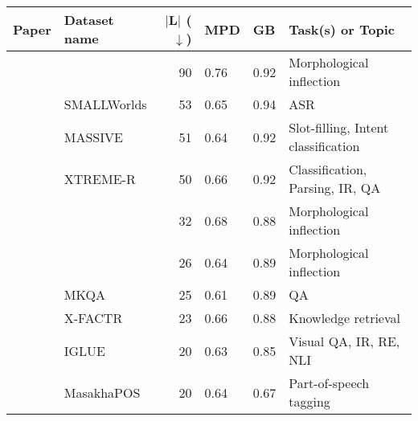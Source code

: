 \begin{tabular}{llrlll}
	\toprule
	\textbf{Paper}                                & \textbf{Dataset name}  & \textbf{$|$L$|$ ($\downarrow$)} & \textbf{MPD}                  & \textbf{GB}                   & \textbf{Task(s) or Topic}           \\\midrule
	\citet{vylomova-etal-2020-sigmorphon}         &                        & 90                              & 0.76\lowcov                   & 0.92\missing                  & Morphological inflection            \\
	\citet{henrichsen-uneson-2012-smallworlds}    & SMALLWorlds            & 53                              & 0.65\lowcov                   & \cellcolor{high-color!40}0.94 & ASR                                 \\
	\citet{fitzgerald-etal-2023-massive}          & MASSIVE                & 51                              & 0.64\lowcov                   & 0.92                          & Slot-filling, Intent classification \\
	\citet{ruder-etal-2021-xtreme}                & XTREME-R               & 50                              & 0.66\lowcov                   & 0.92\missing                  & Classification, Parsing, IR, QA     \\
	\citet{kodner-etal-2022-sigmorphon}           &                        & 32\nolang                       & 0.68\lowcov                   & 0.88\missing                  & Morphological inflection            \\
	\citet{goldman-etal-2023-sigmorphon}          &                        & 26                              & 0.64                          & 0.89                          & Morphological inflection            \\
	\citet{longpre-etal-2021-mkqa}                & MKQA                   & 25                              & 0.61                          & 0.89                          & QA                                  \\
	\citet{jiang-etal-2020-x}                     & X-FACTR                & 23                              & 0.66\lowcov                   & 0.88                          & Knowledge retrieval                 \\
	\citet{bugliarello2022iglue}                  & IGLUE                  & 20                              & 0.63                          & 0.85                          & Visual QA, IR, RE, NLI              \\
	\citet{dione-etal-2023-masakhapos}            & MasakhaPOS             & 20                              & 0.64\lowcov                   & 0.67                          & Part-of-speech tagging              \\

\end{tabular}
